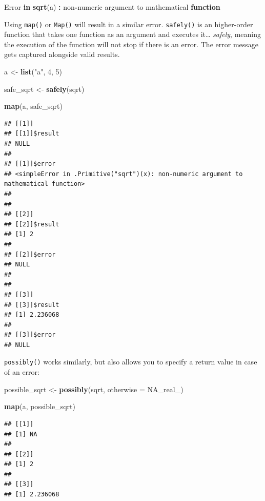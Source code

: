 \documentclass[]{gitbook}
\newenvironment{Shaded}{\begin{snugshade}}{\end{snugshade}}
\newcommand{\ControlFlowTok}[1]{\textcolor[rgb]{0.13,0.29,0.53}{\textbf{#1}}}
\newcommand{\DataTypeTok}[1]{\textcolor[rgb]{0.13,0.29,0.53}{#1}}
\newcommand{\DecValTok}[1]{\textcolor[rgb]{0.00,0.00,0.81}{#1}}
\newcommand{\KeywordTok}[1]{\textcolor[rgb]{0.13,0.29,0.53}{\textbf{#1}}}
\newcommand{\NormalTok}[1]{#1}
\newcommand{\OperatorTok}[1]{\textcolor[rgb]{0.81,0.36,0.00}{\textbf{#1}}}
\newcommand{\OtherTok}[1]{\textcolor[rgb]{0.56,0.35,0.01}{#1}}
\newcommand{\StringTok}[1]{\textcolor[rgb]{0.31,0.60,0.02}{#1}}
\begin{document}
\begin{Shaded}
\begin{Highlighting}[]
\NormalTok{Error }\ControlFlowTok{in} \KeywordTok{sqrt}\NormalTok{(a) }\OperatorTok{:}\StringTok{ }\NormalTok{non}\OperatorTok{-}\NormalTok{numeric argument to mathematical }\ControlFlowTok{function}
\end{Highlighting}
\end{Shaded}

Using \texttt{map()} or \texttt{Map()} will result in a similar error. \texttt{safely()} is an higher-order function that
takes one function as an argument and executes it\ldots{} \emph{safely}, meaning the execution of the function
will not stop if there is an error. The error message gets captured alongside valid results.

\begin{Shaded}
\begin{Highlighting}[]
\NormalTok{a <-}\StringTok{ }\KeywordTok{list}\NormalTok{(}\StringTok{"a"}\NormalTok{, }\DecValTok{4}\NormalTok{, }\DecValTok{5}\NormalTok{)}

\NormalTok{safe_sqrt <-}\StringTok{ }\KeywordTok{safely}\NormalTok{(sqrt)}

\KeywordTok{map}\NormalTok{(a, safe_sqrt)}
\end{Highlighting}
\end{Shaded}

\begin{verbatim}
## [[1]]
## [[1]]$result
## NULL
## 
## [[1]]$error
## <simpleError in .Primitive("sqrt")(x): non-numeric argument to mathematical function>
## 
## 
## [[2]]
## [[2]]$result
## [1] 2
## 
## [[2]]$error
## NULL
## 
## 
## [[3]]
## [[3]]$result
## [1] 2.236068
## 
## [[3]]$error
## NULL
\end{verbatim}

\texttt{possibly()} works similarly, but also allows you to specify a return value in case of an error:

\begin{Shaded}
\begin{Highlighting}[]
\NormalTok{possible_sqrt <-}\StringTok{ }\KeywordTok{possibly}\NormalTok{(sqrt, }\DataTypeTok{otherwise =} \OtherTok{NA_real_}\NormalTok{)}

\KeywordTok{map}\NormalTok{(a, possible_sqrt)}
\end{Highlighting}
\end{Shaded}

\begin{verbatim}
## [[1]]
## [1] NA
## 
## [[2]]
## [1] 2
## 
## [[3]]
## [1] 2.236068
\end{verbatim}
\end{document}
